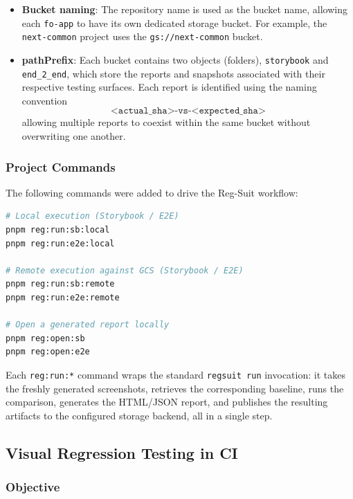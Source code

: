 \begin{itemize}
    \item \textbf{Bucket naming}: The repository name is used as the bucket name, allowing each \texttt{fo-app} to have its own dedicated storage bucket. For example, the \texttt{next-common} project uses the \texttt{gs://next-common} bucket.

    \item \textbf{pathPrefix}: Each bucket contains two objects (folders), \texttt{storybook} and \texttt{end\_2\_end}, which store the reports and snapshots associated with their respective testing surfaces. Each report is identified using the naming convention
    \[
        \texttt{<actual\_sha>-vs-<expected\_sha>}
    \]
    allowing multiple reports to coexist within the same bucket without overwriting one another.
\end{itemize}

\subsubsection{Project Commands}

The following commands were added to drive the Reg-Suit workflow:

\begin{lstlisting}[language=bash]
# Local execution (Storybook / E2E)
pnpm reg:run:sb:local
pnpm reg:run:e2e:local

# Remote execution against GCS (Storybook / E2E)
pnpm reg:run:sb:remote
pnpm reg:run:e2e:remote

# Open a generated report locally
pnpm reg:open:sb
pnpm reg:open:e2e
\end{lstlisting}

Each \texttt{reg:run:*} command wraps the standard \texttt{regsuit run} invocation: it takes the freshly generated screenshots, retrieves the corresponding baseline, runs the comparison, generates the HTML/JSON report, and publishes the resulting artifacts to the configured storage backend, all in a single step.

\subsection{Visual Regression Testing in CI}

\subsubsection{Objective}

